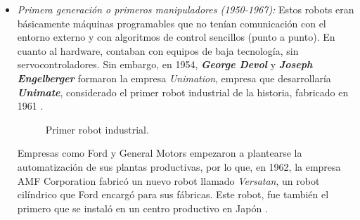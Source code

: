 \begin{itemize}
  \item \textit{Primera generación o primeros manipuladores (1950-1967):} Estos robots eran básicamente máquinas programables que no tenían comunicación con el entorno externo y con algoritmos de control sencillos (punto a punto). En cuanto al hardware, contaban con equipos de baja tecnología, sin servocontroladores. Sin embargo, en 1954, \textbf{\emph{George Devol}} y \textbf{\emph{Joseph Engelberger}} formaron la empresa \emph{Unimation}, empresa que desarrollaría \textbf{\emph{Unimate}}, considerado el primer robot industrial de la historia, fabricado en 1961 \cite{Zamalloa17}.
  
  \begin{figure}[h!]
    \begin{center}
      \subcapcentertrue
      \hspace{2mm}
    \end{center}
    \caption{Primer robot industrial.}
    \label{fig:primer_robot_industrial}
  \end{figure}
  
  \pagebreak
  
  Empresas como Ford y General Motors empezaron a plantearse la automatización de sus plantas productivas, por lo que, en 1962, la empresa AMF Corporation fabricó un nuevo robot llamado \textit{Versatan}, un robot cilíndrico que Ford encargó para sus fábricas.
Este robot, fue también el primero que se instaló en un centro productivo en Japón \cite{Gasparetto19}. 


\end{itemize}
